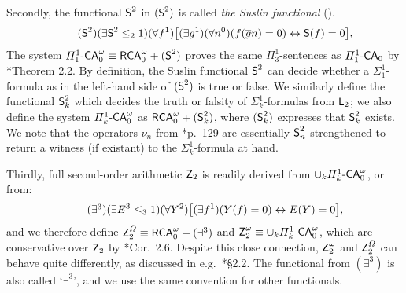 \documentclass[reqno]{amsart}
\newcommand\be{\begin{equation}}
\newcommand\ee{\end{equation}}
\def\FIVE{\Pi_{1}^{1}\text{-\textup{\textsf{CA}}}_{0}}
\def\SIXK{\Pi_{k}^{1}\text{-\textsf{\textup{CA}}}_{0}^{\omega}}
\def\Z{\textup{\textsf{Z}}}
\def\RCAo{\textup{\textsf{RCA}}_{0}^{\omega}}
\def\L{\textsf{\textup{L}}}
\def\asa{\leftrightarrow}
\def\SS{\textup{\textsf{S}}}
\numberwithin{equation}{section}
\numberwithin{thm}{section}
\begin{document}
\smallskip

Secondly, the functional $\SS^{2}$ in $(\SS^{2})$ is called \emph{the Suslin functional} (\cite{kohlenbach2}).
\be\tag{$\SS^{2}$}
(\exists\SS^{2}\leq_{2}1)(\forall f^{1})\big[  (\exists g^{1})(\forall n^{0})(f(\overline{g}n)=0)\asa \SS(f)=0  \big], 
\ee
The system $\FIVE^{\omega}\equiv \RCAo+(\SS^{2})$ proves the same $\Pi_{3}^{1}$-sentences as $\FIVE$ by \cite{yamayamaharehare}*{Theorem 2.2}.   
By definition, the Suslin functional $\SS^{2}$ can decide whether a $\Sigma_{1}^{1}$-formula as in the left-hand side of $(\SS^{2})$ is true or false.   We similarly define the functional $\SS_{k}^{2}$ which decides the truth or falsity of $\Sigma_{k}^{1}$-formulas from $\L_{2}$; we also define 
the system $\SIXK$ as $\RCAo+(\SS_{k}^{2})$, where  $(\SS_{k}^{2})$ expresses that $\SS_{k}^{2}$ exists.  
We note that the operators $\nu_{n}$ from \cite{boekskeopendoen}*{p.\ 129} are essentially $\SS_{n}^{2}$ strengthened to return a witness (if existant) to the $\Sigma_{k}^{1}$-formula at hand.  %

\smallskip

\noindent
Thirdly, full second-order arithmetic $\Z_{2}$ is readily derived from $\cup_{k}\SIXK$, or from:
\be\tag{$\exists^{3}$}
(\exists E^{3}\leq_{3}1)(\forall Y^{2})\big[  (\exists f^{1})(Y(f)=0)\asa E(Y)=0  \big], 
\ee
and we therefore define $\Z_{2}^{\Omega}\equiv \RCAo+(\exists^{3})$ and $\Z_{2}^\omega\equiv \cup_{k}\SIXK$, which are conservative over $\Z_{2}$ by \cite{hunterphd}*{Cor.\ 2.6}. 
Despite this close connection, $\Z_{2}^{\omega}$ and $\Z_{2}^{\Omega}$ can behave quite differently, as discussed in e.g.\ \cite{dagsamIII}*{\S2.2}.   
The functional from $(\exists^{3})$ is also called `$\exists^{3}$', and we use the same convention for other functionals.  

\smallskip
\end{document}
